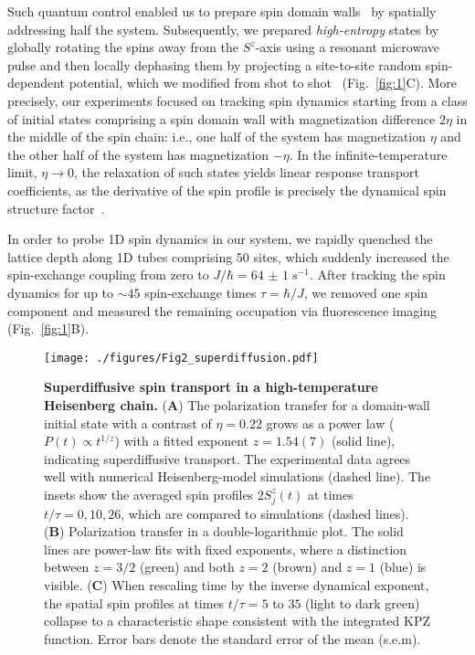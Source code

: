 \documentclass[
 reprint,
 superscriptaddress,
 amsmath,amssymb,
 aps,
 pra,
]{revtex4-2}
\begin{document}
Such quantum control enabled us to prepare spin domain walls~\cite{Halimeh2014,Ljubotina2017,Misguich2017,Ljubotina2019} by spatially addressing half the system.
%
Subsequently, we prepared \emph{high-entropy} states by globally rotating the spins away from the $S^z$-axis using a resonant microwave pulse and then locally dephasing them by projecting a site-to-site random spin-dependent potential, which we modified from shot to shot~\cite{SI} (Fig.~\ref{fig:1}C).
%
More precisely, our experiments focused on tracking spin dynamics starting from a class of initial states comprising a spin domain wall with magnetization difference $2\eta$ in the middle of the spin chain: i.e., one half of the system has magnetization $\eta$ and the other half of the system has magnetization $-\eta$.
%
In the infinite-temperature limit, $\eta \to 0$, the relaxation of such states yields linear response transport coefficients, as the derivative of the spin profile is precisely the dynamical spin structure factor~\cite{Ljubotina2017,Ljubotina2019}.


In order to probe 1D spin dynamics in our system, we rapidly quenched the lattice depth along 1D tubes comprising $50$ sites, which suddenly increased the spin-exchange coupling from zero to $J/\hbar = \SI{64(1)}{s^{-1}}$.
%
After tracking the spin dynamics for up to $\sim 45$ spin-exchange times $\tau= \hbar/J$, we removed one spin component and measured the remaining occupation via fluorescence imaging (Fig.~\ref{fig:1}B).




\begin{figure*}
    \centering
    \texttt{[image: ./figures/Fig2\_superdiffusion.pdf]}
    \caption{\textbf{Superdiffusive spin transport in a high-temperature Heisenberg chain.}
        (\textbf{A}) The polarization transfer for a domain-wall initial state with a contrast of $\eta = 0.22$ grows as a power law ($P(t) \propto t^{1/z}$) with a fitted exponent $z = 1.54 (7)$ (solid line), indicating superdiffusive transport. The experimental data agrees well with numerical Heisenberg-model simulations (dashed line).
        The insets show the averaged spin profiles $2 S_j^z (t)$ at times $ t / \tau = 0, 10, 26$, which are compared to simulations (dashed lines).
        (\textbf{B}) Polarization transfer in a double-logarithmic plot. The solid lines are power-law fits with fixed exponents, where a distinction between $z = 3/2$ (green) and both $z = 2$ (brown) and $z = 1$ (blue) is visible.
        (\textbf{C}) When rescaling time by the inverse dynamical exponent, the spatial spin profiles at times $t/\tau = 5$ to $35$ (light to dark green) collapse to a characteristic shape consistent with the integrated KPZ function.
        Error bars denote the standard error of the mean (s.e.m).
    }
    \label{fig:2}
\end{figure*}
\end{document}
